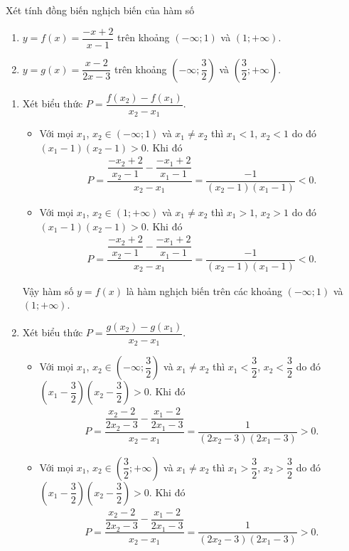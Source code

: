 \begin{bt}%
	Xét tính đồng biến nghịch biến của hàm số
	\begin{enumerate}
		\item $y=f(x)=\dfrac{-x+2}{x-1}$ trên khoảng $(-\infty;1)$ và $(1;+\infty)$. 
		\item $y=g(x)=\dfrac{x-2}{2x-3}$ trên khoảng $\left(-\infty;\dfrac{3}{2}\right)$ và $\left(\dfrac{3}{2};+\infty\right)$.
	\end{enumerate}
	\loigiai
	{
		\begin{enumerate}
			\item Xét biểu thức $P=\dfrac{f(x_2)-f(x_1)}{x_2-x_1}$. 
			\begin{itemize}
				\item Với mọi $x_1$, $x_2\in (-\infty;1)$ và $x_1\neq x_2$ thì $x_1<1$, $x_2<1$ do đó $(x_1-1)(x_2-1)>0$. Khi đó
				\begin{align*}
					P=\dfrac{\dfrac{-x_2+2}{x_2-1}-\dfrac{-x_1+2}{x_1-1}}{x_2-x_1}=\dfrac{-1}{(x_2-1)(x_1-1)}<0.
				\end{align*}
				\item Với mọi $x_1$, $x_2\in (1;+\infty)$ và $x_1\neq x_2$ thì $x_1>1$, $x_2>1$ do đó $(x_1-1)(x_2-1)>0$. Khi đó
				\begin{align*}
					P=\dfrac{\dfrac{-x_2+2}{x_2-1}-\dfrac{-x_1+2}{x_1-1}}{x_2-x_1}=\dfrac{-1}{(x_2-1)(x_1-1)}<0.
				\end{align*}
			\end{itemize}
			Vậy hàm số $y=f(x)$ là hàm nghịch biến trên các khoảng $(-\infty;1)$ và $(1;+\infty)$.
			\item Xét biểu thức $P=\dfrac{g(x_2)-g(x_1)}{x_2-x_1}$.
			\begin{itemize}
				\item Với mọi $x_1$, $x_2\in \left(-\infty;\dfrac{3}{2}\right)$ và $x_1\neq x_2$ thì $x_1<\dfrac{3}{2}$, $x_2<\dfrac{3}{2}$ do đó $\left(x_1-\dfrac{3}{2}\right)\left(x_2-\dfrac{3}{2}\right)>0$. Khi đó
				\begin{align*}
					P=\dfrac{\dfrac{x_2-2}{2x_2-3}-\dfrac{x_1-2}{2x_1-3}}{x_2-x_1}=\dfrac{1}{(2x_2-3)(2x_1-3)}>0.
				\end{align*}
				\item Với mọi $x_1$, $x_2\in \left(\dfrac{3}{2};+\infty\right)$ và $x_1\neq x_2$ thì $x_1>\dfrac{3}{2}$, $x_2>\dfrac{3}{2}$ do đó $\left(x_1-\dfrac{3}{2}\right)\left(x_2-\dfrac{3}{2}\right)>0$. Khi đó
				\begin{align*}
					P=\dfrac{\dfrac{x_2-2}{2x_2-3}-\dfrac{x_1-2}{2x_1-3}}{x_2-x_1}=\dfrac{1}{(2x_2-3)(2x_1-3)}>0.
				\end{align*}
			\end{itemize}
		\end{enumerate}
	}
\end{bt}

